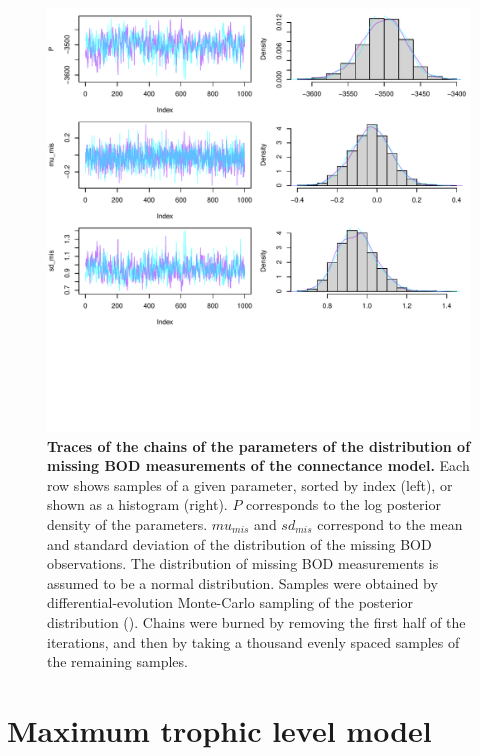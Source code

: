 \documentclass[11pt, oneside]{article}
\begin{document}
\begin{figure}[H]
\begin{center}
\includegraphics[page=1, width=1\linewidth]{b0_6_2/out_con/fig_tracePlot_sd_mis.pdf}
\caption{
    \textbf{Traces of the chains of the parameters of the distribution of missing BOD measurements of the connectance model.}
    Each row shows samples of a given parameter, sorted by index (left), or shown as a histogram (right).
    $P$ corresponds to the log posterior density of the parameters.
    $mu_{mis}$ and $sd_{mis}$ correspond to the mean and standard deviation of the distribution of the missing BOD observations.
    The distribution of missing BOD measurements is assumed to be a normal distribution.
    Samples were obtained by differential-evolution Monte-Carlo sampling of the posterior distribution (\cite{TerBraak2006}).
    Chains were burned by removing the first half of the iterations, and then by taking a thousand evenly spaced samples of the remaining samples.
} 
\end{center}
\end{figure}

\newpage
\section{Maximum trophic level model}
\end{document}
